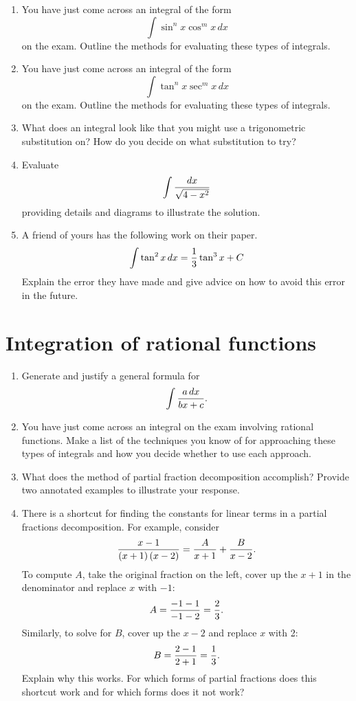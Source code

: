 \begin{enumerate}
\item  You have just come across an integral of the form $$\int {\sin ^n x\cos ^m x\,dx} $$ on the exam.  Outline the methods for evaluating these types of integrals.

\item  You have just come across an integral of the form $$\int {\tan ^n x\sec ^m x\,dx} $$ on the exam.  Outline the methods for evaluating these types of integrals.

\item  What does an integral look like that you might use a trigonometric substitution on?  How do you decide on what substitution to try?

\item  Evaluate  $$\int {{{dx} \over {\sqrt {4 - x^2 } }}} $$ providing details and diagrams to illustrate the solution.  

\item  A friend of yours has the following work on their paper.
	$$\int {\tan ^2 x\,dx}  = {1 \over 3}\tan ^3 x + C$$
Explain the error they have made and give advice on how to avoid this error in the future. \end{enumerate}\section{Integration of rational functions}\begin{enumerate}

\item  Generate and justify a general formula for $$\int {{{a\,dx} \over {bx + c}}} .$$

\item  You have just come across an integral on the exam involving rational functions.  Make a list of the techniques you know of for approaching these types of integrals and how you decide whether to use each approach.

\item  What does the method of partial fraction decomposition accomplish?  Provide two annotated examples to illustrate your response.


\item  There is a shortcut for finding the constants for linear terms in a partial fractions decomposition.  For example, consider 
		$${{x - 1} \over {\left( {x + 1} \right)\left( {x - 2} \right)}} = {A \over {x + 1}} + {B \over {x - 2}}.$$
To compute $A$, take the original fraction on the left, cover up the $x + 1$ in the denominator and replace $x$ with $-1$: $$A = {{ - 1 - 1} \over { - 1 - 2}} = {2 \over 3}.$$  Similarly, to solve for $B$, cover up the $x - 2$ and replace $x$ with 2: $$B = {{2 - 1} \over {2 + 1}} = {1 \over 3}.$$  Explain why this works.  \cite{SM}   For which forms of partial fractions does this shortcut work and for which forms does it not work?


\end{enumerate}

